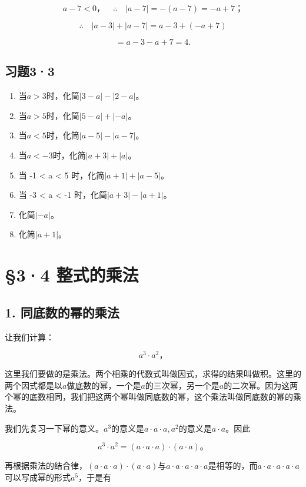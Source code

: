 \[
a - 7 < 0\text{，} \quad \therefore \quad | a - 7 | = - (a - 7) = - a + 7\text{；}
\]

\[
\therefore \quad | a - 3 | + | a - 7 | = a - 3 + (- a + 7)
\]

\[
= a - 3 - a + 7 = 4.
\]

\subsection{习题3·3}

\begin{enumerate}
\item
  当\(a > 3\)时，化简\(|3 - a| - |2 - a|\)。
\item
  当\(a > 5\)时，化简\(|5 - a| + |-a|\)。
\item
  当\(a < 5\)时，化简\(|a - 5| - |a - 7|\)。
\item
  当\(a < -3\)时，化简\(|a + 3| + |a|\)。
\item
  当 -1 \textless{} a \textless{} 5
  时，化简\(\left|a + 1\right| + \left|a - 5\right|\)。
\item
  当 -3 \textless{} a \textless{} -1
  时，化简\(\left|a + 3\right| - \left|a + 1\right|\)。
\item
  化简\(\left|-a\right|\)。
\item
  化简\(\left|a+1\right|\)。
\end{enumerate}

\section{§3·4 整式的乘法}

\subsection{1. 同底数的幂的乘法}

让我们计算：

\[
a ^{3} \cdot a ^{2}\text{，}
\]

这里我们要做的是乘法。两个相乘的代数式叫做因式，求得的结果叫做积。这里的两个因式都是以\(a\)做底数的幂，一个是\(a\)的三次幂，另一个是\(a\)的二次幂。因为这两个幂的底数相同，我们把这两个幂叫做同底数的幂，这个乘法叫做同底数的幂的乘法。

我们先复习一下幂的意义。\(a^3\)的意义是\(a \cdot a \cdot a, a^2\)的意义是\(a \cdot a\)。因此

\[
a ^{3} \cdot a ^{2} = (a \cdot a \cdot a) \cdot (a \cdot a)\text{。}
\]

再根据乘法的结合律，\((a\cdot a\cdot a)\cdot (a\cdot a)\)与\(a\cdot a\cdot a\cdot a\cdot a\)是相等的，而\(a\cdot a\cdot a\cdot a\cdot a\)可以写成幂的形式\(a^5\)，于是有

